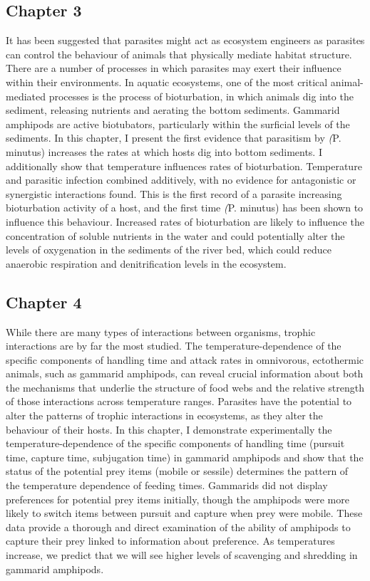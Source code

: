 \subsection{Chapter 3}
It has been suggested that parasites might act as ecosystem engineers as parasites can control the behaviour of animals that physically mediate habitat structure. There are a number of processes in which parasites may exert their influence within their environments. In aquatic ecosystems, one of the most critical animal-mediated processes is the process of bioturbation, in which animals dig into the sediment, releasing nutrients and aerating the bottom sediments. Gammarid amphipods are active biotubators, particularly within the surficial levels of the sediments. In this chapter, I present the first evidence that parasitism by \emph(P. minutus) increases the rates at which hosts dig into bottom sediments. I additionally show that temperature influences rates of bioturbation. Temperature and parasitic infection combined additively, with no evidence for antagonistic or synergistic interactions found.  This is the first record of a parasite increasing bioturbation activity of a host, and the first time \emph(P. minutus) has been shown to influence this behaviour. Increased rates of bioturbation are likely to influence the concentration of soluble nutrients in the water and could potentially alter the levels of oxygenation in the sediments of the river bed, which could reduce anaerobic respiration and denitrification levels in the ecosystem.  

\subsection{Chapter 4}
While there are many types of interactions between organisms, trophic interactions are by far the most studied. The temperature-dependence of the specific components of handling time and attack rates in omnivorous, ectothermic animals, such as gammarid amphipods, can reveal crucial information about both the mechanisms that underlie the structure of food webs and the relative strength of those interactions across temperature ranges. Parasites have the potential to alter the patterns of trophic interactions in ecosystems, as they alter the behaviour of their hosts. In this chapter, I demonstrate experimentally the temperature-dependence of the specific components of handling time (pursuit time, capture time, subjugation time) in gammarid amphipods and show that the status of the potential prey items (mobile or sessile) determines the pattern of the temperature dependence of feeding times.  Gammarids did not display preferences for potential prey items initially, though the amphipods were more likely to switch items between pursuit and capture when prey were mobile.  These data provide a thorough and direct examination of the ability of amphipods to capture their prey linked to information about preference. As temperatures increase, we predict that we will see higher levels of scavenging and shredding in gammarid amphipods. 

